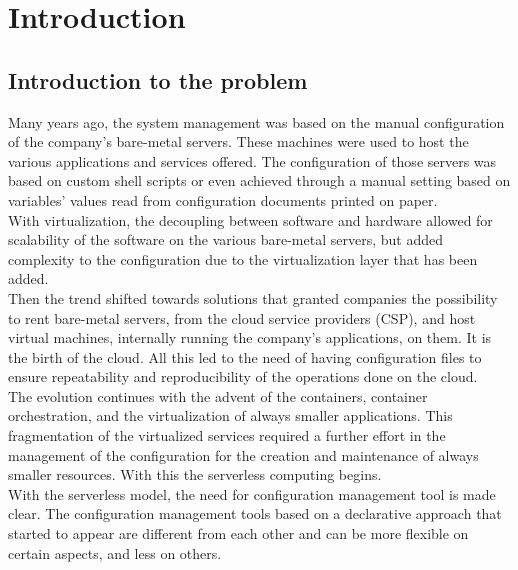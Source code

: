 
\chapter{Introduction}
\label{cap:introduction}


\section{Introduction to the problem}
Many years ago, the system management was based on the manual configuration of the company's bare-metal servers.
These machines were used to host the various applications and services offered.
The configuration of those servers was based on custom shell scripts or even achieved through a manual setting based on variables' values read from configuration documents printed on paper.\\
With virtualization, the decoupling between software and hardware allowed for scalability of the software on the various bare-metal servers, but added complexity to the configuration due to the virtualization layer that has been added.\\
Then the trend shifted towards solutions that granted companies the possibility to rent bare-metal servers, from the cloud service providers (CSP), and host virtual machines, internally running the company's applications, on them.
It is the birth of the cloud.
All this led to the need of having configuration files to ensure repeatability and reproducibility of the operations done on the cloud.\\
The evolution continues with the advent of the containers, container orchestration, and the virtualization of always smaller applications.
This fragmentation of the virtualized services required a further effort in the management of the configuration for the creation and maintenance of always smaller resources.
With this the serverless computing begins.\\
With the serverless model, the need for configuration management tool is made clear.
The configuration management tools based on a declarative approach that started to appear are different from each other and can be more flexible on certain aspects, and less on others.
